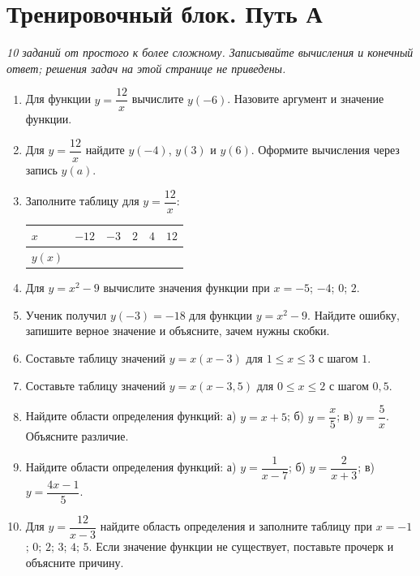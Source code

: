 \documentclass[a4paper,12pt]{article}
\newcommand{\sectionrule}{\vspace{-0.55em}{\color{accent}\hrule height .6pt}\vspace{0.5em}}
\begin{document}
\section*{Тренировочный блок. Путь А}
\sectionrule
\textit{10 заданий от простого к более сложному. Записывайте вычисления и конечный ответ; решения задач на этой странице не приведены.}
\begin{enumerate}[label=\textbf{\arabic*.},itemsep=1.05em]
\item Для функции $y=\dfrac{12}{x}$ вычислите $y(-6)$. Назовите аргумент и значение функции.
\item Для $y=\dfrac{12}{x}$ найдите $y(-4)$, $y(3)$ и $y(6)$. Оформите вычисления через запись $y(a)$.
\item Заполните таблицу для $y=\dfrac{12}{x}$:
\begin{center}\renewcommand{\arraystretch}{1.25}
\begin{tabularx}{.91\linewidth}{@{}l*{5}{C}@{}}\toprule
$x$ & $-12$ & $-3$ & $2$ & $4$ & $12$\\\midrule
$y(x)$ & & & & & \\\bottomrule
\end{tabularx}\end{center}
\item Для $y=x^2-9$ вычислите значения функции при $x=-5$; $-4$; $0$; $2$.
\item Ученик получил $y(-3)=-18$ для функции $y=x^2-9$. Найдите ошибку, запишите верное значение и объясните, зачем нужны скобки.
\item Составьте таблицу значений $y=x(x-3)$ для $1\le x\le3$ с шагом $1$.
\item Составьте таблицу значений $y=x(x-3{,}5)$ для $0\le x\le2$ с шагом $0{,}5$.
\item Найдите области определения функций: а) $y=x+5$; б) $y=\dfrac{x}{5}$; в) $y=\dfrac5x$. Объясните различие.
\item Найдите области определения функций: а) $y=\dfrac1{x-7}$; б) $y=\dfrac2{x+3}$; в) $y=\dfrac{4x-1}{5}$.
\item Для $y=\dfrac{12}{x-3}$ найдите область определения и заполните таблицу при $x=-1$; $0$; $2$; $3$; $4$; $5$. Если значение функции не существует, поставьте прочерк и объясните причину.
\end{enumerate}
\clearpage
\end{document}
